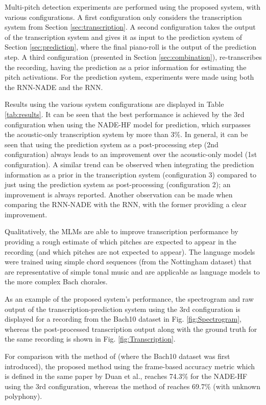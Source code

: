 Multi-pitch detection experiments are performed using the proposed system, with various configurations. A first configuration only considers the transcription system from Section \ref{sec:transcription}. A second configuration takes the output of the transcription system and gives it as input to the prediction system of Section \ref{sec:prediction}, where the final piano-roll is the output of the prediction step. A third configuration (presented in Section \ref{sec:combination}), re-transcribes the recording, having the prediction as a prior information for estimating the pitch activations. For the prediction system, experiments were made using both the RNN-NADE and the RNN.

Results using the various system configurations are displayed in Table \ref{tab:results}. It can be seen that the best performance is achieved by the 3rd configuration when using the NADE-HF model for prediction, which surpasses the acoustic-only transcription system by more than 3\%. In general, it can be seen that using the prediction system as a post-processing step (2nd configuration) always leads to an improvement over the acoustic-only model (1st configuration). A similar trend can be observed when integrating the prediction information as a prior in the transcription system (configuration 3) compared to just using the prediction system as post-processing (configuration 2); an improvement is always reported. Another observation can be made when comparing the RNN-NADE with the RNN, with the former providing a clear improvement. 

Qualitatively, the MLMs are able to improve transcription performance by providing a rough estimate of which pitches are expected to appear in the recording (and which pitches are not expected to appear). The language models were trained using simple chord sequences (from the Nottingham dataset) that are representative of simple tonal music and are applicable as language models to the more complex Bach chorales.

As an example of the proposed system's performance, the spectrogram and raw output of the transcription-prediction system using the 3rd configuration is displayed for a recording from the Bach10 dataset in Fig. \ref{fig:Spectrogram}, whereas the post-processed transcription output along with the ground truth for the same recording is shown in Fig. \ref{fig:Transcription}.

For comparison with the method of \cite{Duan2010} (where the Bach10 dataset was first introduced), the proposed method using the frame-based accuracy metric which is defined in the same paper by Duan et al., reaches 74.3\% for the NADE-HF using the 3rd configuration, whereas the method of \cite{Duan2010} reaches 69.7\% (with unknown polyphony).


